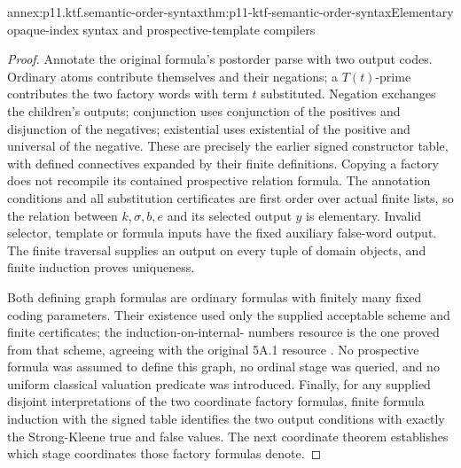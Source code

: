 \begin{annexitem}{annex:p11.ktf.semantic-order-syntax}{thm:p11-ktf-semantic-order-syntax}{Elementary opaque-index syntax and prospective-template compilers}
\begin{proof}
Annotate the original formula's postorder parse with two output
codes. Ordinary atoms contribute themselves and their negations;
a \(T(t)\)-prime contributes the two factory words with term
\(t\) substituted. Negation exchanges the children's outputs;
conjunction uses conjunction of the positives and disjunction of
the negatives; existential uses existential of the positive and
universal of the negative. These are precisely the earlier signed
constructor table, with defined connectives expanded by their finite
definitions. Copying a factory does not recompile its contained
prospective relation formula. The annotation conditions and all
substitution certificates are first order over actual finite lists,
so the relation between \(k,\sigma,b,e\) and its selected
output \(y\) is elementary. Invalid selector, template or formula
inputs have the fixed auxiliary false-word output. The finite
traversal supplies an output on every tuple of domain objects,
and finite induction proves uniqueness.

Both defining graph formulas are ordinary formulas with finitely
many fixed coding parameters. Their existence used only the supplied
acceptable scheme and finite certificates; the induction-on-internal-
numbers resource is the one proved from that scheme, agreeing with
the original 5A.1 resource \cite[pp.~65--66]{Moschovakis1974EIASOriginal}.
No prospective formula was assumed to define this graph, no ordinal
stage was queried, and no uniform classical valuation predicate was
introduced. Finally, for any supplied disjoint interpretations of
the two coordinate factory formulas, finite formula induction with
the signed table identifies the two output conditions with exactly
the Strong-Kleene true and false values. The next coordinate theorem
establishes which stage coordinates those factory formulas denote.
\end{proof}
\end{annexitem}

